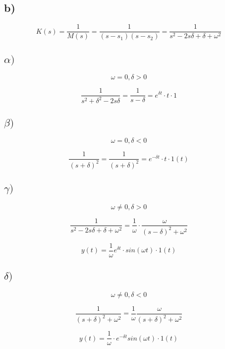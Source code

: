 \documentclass{article}
\begin{document}
\subsection*{b)}

$$ K(s)=\frac{1}{M(s)}=\frac{1}{(s-s_{1})(s-s_{2})}=\frac{1}{s^{2}-2s\delta+\delta +\omega^{2}} $$
\subsection*{$\alpha)$}

$$ \omega=0, \delta>0 $$

$$ \frac{1}{s^{2}+\delta^{2}-2s\delta}=\frac{1}{s-\delta}=e^{\delta t}\cdot t\cdot 1 $$
\subsection*{$\beta)$}
$$\omega=0, \delta<0$$

$$ \frac{1}{(s+\delta)^{2}}=\frac{1}{(s+\delta)^{2}}=e^{-\delta t}\cdot t \cdot 1(t) $$

\subsection*{$\gamma)$}

$$\omega\neq 0, \delta>0$$

$$ \frac{1}{s^{2}-2s\delta + \delta + \omega^{2}} = \frac{1}{\omega}\cdot \frac{\omega}{(s-\delta)^{2}+\omega^{2}}$$

$$ y(t)=\frac{1}{\omega}e^{\delta t}\cdot sin(\omega t)\cdot 1(t) $$


\subsection*{$\delta)$}

$$ \omega \neq 0, \delta<0$$

$$ \frac{1}{(s+\delta)^{2}+\omega^{2}}= \frac{1}{\omega}\frac{\omega}{(s+\delta)^{2}+\omega^{2}} $$

$$ y(t) = \frac{1}{\omega}\cdot e^{-\delta t} sin(\omega t) \cdot 1(t)$$
\end{document}
